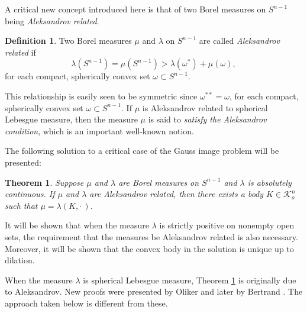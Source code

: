 \documentclass{cpamart1}     %
\newtheorem{theo}{Theorem}[section]
\theoremstyle{definition}
\newtheorem*{definition-non}{Definition}
\theoremstyle{remark}
\newcommand{\sn}{S^{n-1}}
\newcommand{\kno}{\mathcal K^n_o}
\begin{document}
A critical new concept introduced here is that of two Borel measures on $\sn$ being
{\it Aleksandrov related}.

\begin{definition-non}
Two Borel measures $\mu$ and $\lambda$ on $S^{n-1}$ are called {\it Aleksandrov related} if
\begin{equation*}
\lambda(S^{n-1})=\mu(S^{n-1}) > \lambda(\omega^*) + \mu(\omega),
\end{equation*}
for each compact, spherically convex set $\omega\subset\sn$.
\end{definition-non}

\noindent
This relationship is easily seen to be symmetric since $\omega^{**}=\omega$, for each compact, spherically convex set $\omega\subset\sn$.
If $\mu$ is Aleksandrov related to spherical Lebesgue measure, then the measure  $\mu$ is said to
{\it satisfy the Aleksandrov condition}, which is an important well-known notion.



The following solution to a critical case of the Gauss image problem will be presented:

\begin{theo}\label{smt}
Suppose $\mu$ and $\lambda$ are Borel measures on $\sn$ and
$\lambda$ is absolutely continuous.
If $\mu$ and $\lambda$ are Aleksandrov related, then
there exists a body $K\in\kno$ such that $\mu=\lambda(K,\cdot\,)$.
\end{theo}


It will be shown that when the measure $\lambda$ is strictly positive on nonempty open sets,
the requirement that the measures be Aleksandrov related is also necessary. Moreover,
it will be shown that the convex body
in the solution is unique up to dilation.

When the measure $\lambda$ is spherical Lebesgue measure, Theorem \ref{smt} is originally due to Aleksandrov.
New proofs were presented by Oliker \cite{Ol} and later by Bertrand \cite{Bgeomded}.
The approach taken below is different from these.


\end{document}
